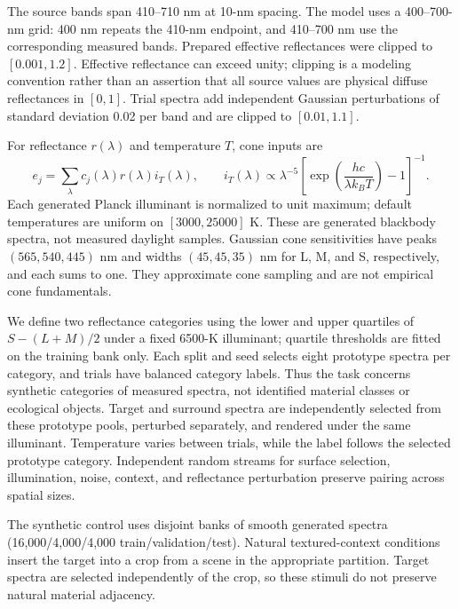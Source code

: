 \documentclass[authoryear,preprint,review,12pt]{elsarticle}
\begin{document}
The source bands span 410--710 nm at 10-nm spacing. The model uses a 400--700-nm grid: 400 nm repeats the 410-nm endpoint, and 410--700 nm use the corresponding measured bands. Prepared effective reflectances were clipped to $[0.001,1.2]$. Effective reflectance can exceed unity; clipping is a modeling convention rather than an assertion that all source values are physical diffuse reflectances in $[0,1]$. Trial spectra add independent Gaussian perturbations of standard deviation 0.02 per band and are clipped to $[0.01,1.1]$.

For reflectance $r(\lambda)$ and temperature $T$, cone inputs are
\begin{equation}
e_j=\sum_{\lambda} c_j(\lambda)r(\lambda)i_T(\lambda),\qquad
i_T(\lambda)\propto\lambda^{-5}\left[\exp\!\left(\frac{hc}{\lambda k_B T}\right)-1\right]^{-1}.
\end{equation}
Each generated Planck illuminant is normalized to unit maximum; default temperatures are uniform on $[3000,25000]$ K. These are generated blackbody spectra, not measured daylight samples. Gaussian cone sensitivities have peaks $(565,540,445)$ nm and widths $(45,45,35)$ nm for L, M, and S, respectively, and each sums to one. They approximate cone sampling and are not empirical cone fundamentals.

We define two reflectance categories using the lower and upper quartiles of $S-(L+M)/2$ under a fixed 6500-K illuminant; quartile thresholds are fitted on the training bank only. Each split and seed selects eight prototype spectra per category, and trials have balanced category labels. Thus the task concerns synthetic categories of measured spectra, not identified material classes or ecological objects. Target and surround spectra are independently selected from these prototype pools, perturbed separately, and rendered under the same illuminant. Temperature varies between trials, while the label follows the selected prototype category. Independent random streams for surface selection, illumination, noise, context, and reflectance perturbation preserve pairing across spatial sizes.

The synthetic control uses disjoint banks of smooth generated spectra (16,000/4,000/4,000 train/validation/test). Natural textured-context conditions insert the target into a crop from a scene in the appropriate partition. Target spectra are selected independently of the crop, so these stimuli do not preserve natural material adjacency.
\end{document}
